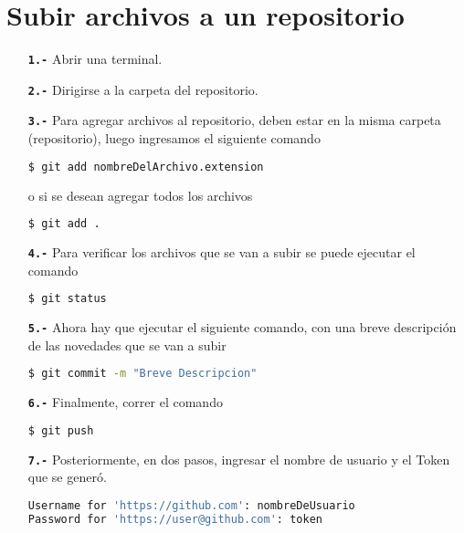 \section{Subir archivos a un repositorio}
	\begin{itemize}
		\item[\textbf{\texttt{1.-}}] Abrir una terminal.
		\item[\textbf{\texttt{2.-}}] Dirigirse a la carpeta del repositorio.
		\item[\textbf{\texttt{3.-}}] Para agregar archivos al repositorio, deben estar en la misma carpeta (repositorio), luego ingresamos el siguiente comando
		\begin{lstlisting}[language=bash, caption= Ejemplo. Agregar un archivo]
$ git add nombreDelArchivo.extension\end{lstlisting}
		o si se desean agregar todos los archivos
		\begin{lstlisting}[language=bash, caption= Ejemplo. Agregar todos los archivos]
$ git add .\end{lstlisting}
		\item[\textbf{\texttt{4.-}}] Para verificar los archivos que se van a subir se puede ejecutar el comando 
		\begin{lstlisting}[language=bash, caption= Ejemplo. Estatus del almacenaje]
$ git status\end{lstlisting}
		\item[\textbf{\texttt{5.-}}] Ahora hay que ejecutar el siguiente comando, con una breve descripción de las novedades que se van a subir
		\begin{lstlisting}[language=bash, caption= Ejemplo. Hacer commit]
$ git commit -m "Breve Descripcion"\end{lstlisting}
		\item[\textbf{\texttt{6.-}}] Finalmente, correr el comando 
		\begin{lstlisting}[language=bash, caption= Ejemplo. Subir al repositorio]
$ git push\end{lstlisting}
		\item[\textbf{\texttt{7.-}}] Posteriormente, en dos pasos, ingresar el nombre de usuario y el Token que se generó. 
		\begin{lstlisting}[language=bash, caption= Ejemplo. Subir al repositorio]       
Username for 'https://github.com': nombreDeUsuario
Password for 'https://user@github.com': token\end{lstlisting} 
	\end{itemize}